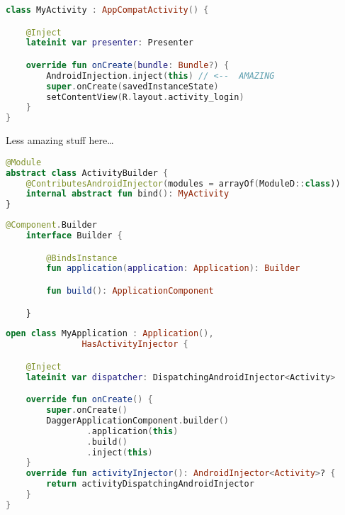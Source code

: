 \documentclass[10pt]{beamer}
\begin{document}
\begin{frame}[fragile]
\begin{lstlisting}[language=Kotlin, basicstyle=\ttfamily]
class MyActivity : AppCompatActivity() {

    @Inject
    lateinit var presenter: Presenter

    override fun onCreate(bundle: Bundle?) {
        AndroidInjection.inject(this) // <--  AMAZING 
        super.onCreate(savedInstanceState)
        setContentView(R.layout.activity_login)
    }
}
\end{lstlisting} 
\end{frame}


\begin{frame}[fragile]
Less amazing stuff here\ldots 
\begin{lstlisting}[language=Kotlin, basicstyle=\ttfamily]
@Module
abstract class ActivityBuilder {
    @ContributesAndroidInjector(modules = arrayOf(ModuleD::class))
    internal abstract fun bind(): MyActivity
}
\end{lstlisting} 
\end{frame}

\begin{frame}[fragile]
\begin{lstlisting}[language=Kotlin, basicstyle=\ttfamily]
@Component.Builder
    interface Builder {

        @BindsInstance
        fun application(application: Application): Builder

        fun build(): ApplicationComponent

    }
\end{lstlisting} 
\end{frame}

\begin{frame}[fragile]
\begin{lstlisting}[language=Kotlin, basicstyle=\ttfamily]
open class MyApplication : Application(), 
               HasActivityInjector {

    @Inject
    lateinit var dispatcher: DispatchingAndroidInjector<Activity>

    override fun onCreate() {
        super.onCreate()
        DaggerApplicationComponent.builder()
                .application(this)
                .build()
                .inject(this)
    }
    override fun activityInjector(): AndroidInjector<Activity>? {
        return activityDispatchingAndroidInjector
    }
}
\end{lstlisting} 
\end{frame}
\end{document}
